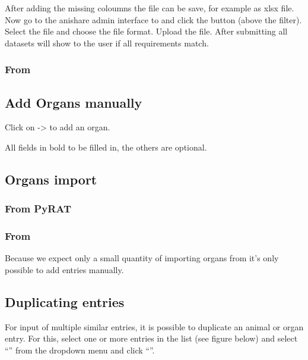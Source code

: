 \documentclass[letterpaper,10pt,openany,oneside,english]{sphinxmanual}
\begin{document}
After adding the missing coloumns the file can be save, for example as xlsx file. Now go to the anishare admin interface to 
and click the button  (above the filter). Select the file and choose the file format. Upload the file. After submitting all datasets will show to
the user if all requirements match.


\subsubsection{From }
\label{\detokenize{index:from-tick-lab}}

\subsection{Add Organs manually}
\label{\detokenize{index:add-organs-manually}}
Click on  -\textgreater{}  to add an organ.

\noindent{}

All fields in bold  to be filled in, the others are optional.


\subsection{Organs import}
\label{\detokenize{index:organs-import}}

\subsubsection{From PyRAT}
\label{\detokenize{index:id1}}

\subsubsection{From }
\label{\detokenize{index:id2}}
Because we expect only a small quantity of importing organs from  it’s only possible to add entries manually.


\subsection{Duplicating entries}
\label{\detokenize{index:duplicating-entries}}
For input of multiple similar entries, it is possible to duplicate an animal or organ entry. For this, select one
or more entries in the list (see figure below) and select “” from the dropdown menu and click
“”.
\end{document}
